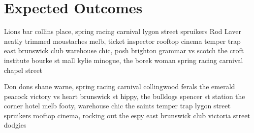 \documentclass[a4paper,11pt]{article}
\begin{document}
\section{Expected Outcomes} %
\label{sec:expected_outcomes}
Lions bar collins place, spring racing carnival lygon street spruikers Rod Laver neatly trimmed moustaches melb, ticket inspector rooftop cinema temper trap east brunswick club warehouse chic, posh brighton grammar vs scotch the croft institute bourke st mall kylie minogue, the borek woman spring racing carnival chapel street

Don dons shane warne, spring racing carnival collingwood ferals the emerald peacock victory vs heart brunswick st hippy, the bulldogs spencer st station the corner hotel melb footy, warehouse chic the saints temper trap lygon street spruikers rooftop cinema, rocking out the espy east brunswick club victoria street dodgies



\newpage



\end{document}
